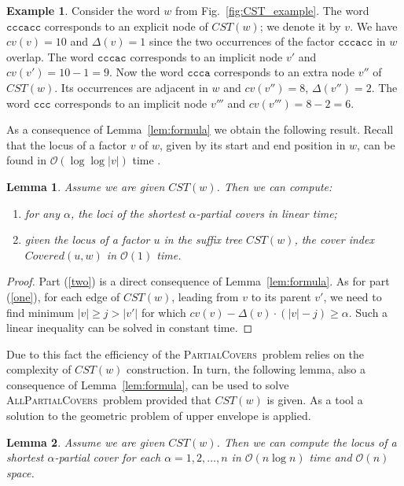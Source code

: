 \documentclass{article}
\theoremstyle{theorem}
\newtheorem{lemma}{Lemma}
\theoremstyle{definition}
\newtheorem{example}{Example}
\newcommand{\Covered}{\mathit{Covered}}
\newcommand{\CST}{\mathit{CST}}
\renewcommand{\c}{\mathit{cv}}
\newcommand{\Oh}{\mathcal{O}}
\newcommand{\PC}{{\textsc{PartialCovers}}}
\newcommand{\APC}{{\textsc{AllPartialCovers}}}
\begin{document}
  \begin{example}
    Consider the word $w$ from Fig.~\ref{fig:CST_example}.
    The word $\texttt{cccacc}$ corresponds to an explicit node of $\CST(w)$; we denote it by $v$.
    We have $\c(v)=10$ and $\Delta(v)=1$ since the two occurrences of the factor $\texttt{cccacc}$ 
    in $w$ overlap.
    The word $\texttt{cccac}$ corresponds to an implicit node $v'$ and $\c(v') = 10 - 1 = 9$.
    Now the word $\texttt{ccca}$ corresponds to an extra node $v''$ of $\CST(w)$.
    Its occurrences are adjacent in $w$ and $\c(v'')=8$, $\Delta(v'')=2$.
    The word $\texttt{ccc}$ corresponds to an implicit node $v'''$ and $\c(v''') = 8 - 2 = 6$.
  \end{example}


  \noindent
  As a consequence of Lemma~\ref{lem:formula} we obtain the following result.
  Recall that the locus of a factor $v$ of $w$, given by its start and end position
  in $w$, can be found in $\Oh(\log\log |v|)$ time \cite{DBLP:conf/cpm/KucherovNS12}.
  \begin{lemma}\label{lem:if_CST}
    Assume we are given $\CST(w)$.
    Then we can compute:
    \begin{enumerate}[(1)]
      \item\label{one} for any $\alpha$, the loci of the shortest $\alpha$-partial covers in linear time;
      \item\label{two} given the locus of a factor $u$ in the suffix tree
      $\CST(w)$, the cover index $\Covered(u,w)$ in $\Oh(1)$ time.
    \end{enumerate}
  \end{lemma}
  \begin{proof}
    Part (\ref{two}) is a direct consequence of Lemma~\ref{lem:formula}.
    As for part (\ref{one}), for each edge of $\CST(w)$, leading from $v$ to its parent $v'$,
    we need to find minimum $|v| \ge j > |v'|$ for which
    $\c(v)-\Delta(v) \cdot (|v|-j) \ge \alpha$.
    Such a linear inequality can be solved in constant time.
  \end{proof}
  Due to this fact the efficiency of the \PC\ problem
  relies on the complexity of $\CST(w)$ construction.
  In turn, the following lemma, also a consequence of Lemma~\ref{lem:formula},
  can be used to solve \APC\ problem
  provided that $\CST(w)$ is given.
  As a tool a solution to the geometric problem of upper envelope
  \cite{DBLP:journals/ipl/Hershberger89} is applied.
  \begin{lemma}\label{lem:all_if_CST}
    Assume we are given $\CST(w)$.
    Then we can compute the locus of a shortest $\alpha$-partial cover
    for each $\alpha=1,2,\ldots,n$ in $\Oh(n\log n)$ time and $\Oh(n)$ space.
  \end{lemma}
\end{document}
